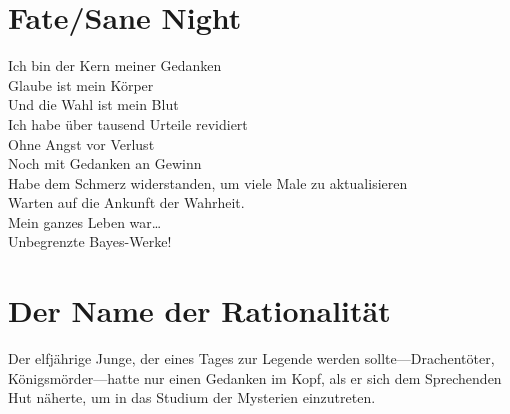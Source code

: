 \section{Fate/Sane Night}
%
\begin{emph}
Ich bin der Kern meiner Gedanken\\
Glaube ist mein Körper\\
Und die Wahl ist mein Blut\\
Ich habe über tausend Urteile revidiert\\
Ohne Angst vor Verlust\\
Noch mit Gedanken an Gewinn\\
Habe dem Schmerz widerstanden, um viele Male zu aktualisieren\\
Warten auf die Ankunft der Wahrheit.\\
Mein ganzes Leben war…\\
Unbegrenzte Bayes-Werke!\\
\end{emph}

\section{Der Name der Rationalität}

Der elfjährige Junge, der eines Tages zur Legende werden sollte—Drachentöter, Königsmörder—hatte nur einen Gedanken im Kopf, als er sich dem Sprechenden Hut näherte, um in das Studium der Mysterien einzutreten.

